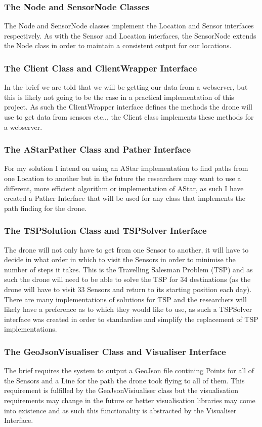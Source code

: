 \documentclass[12pt]{article}
\begin{document}
\subsubsection{The Node and SensorNode Classes}
The Node and SensorNode classes implement the Location and Sensor interfaces respectively. As with the Sensor and Location interfaces, the SensorNode extends the Node class in order to maintain a consistent output for our locations.
\subsubsection{The Client Class and  ClientWrapper Interface}
In the brief we are told that we will be getting our data from a webserver, but this is likely not going to be the case in a practical implementation of this project. As such the ClientWrapper interface defines the methods the drone will use to get data from sensors etc.., the Client class implements these methods for a webserver.
\subsubsection{The AStarPather Class and Pather Interface}
For my solution I intend on using an AStar implementation to find paths from one Location to another but in the future the researchers may want to use a different, more efficient algorithm or implementation of AStar, as such I have created a Pather Interface that will be used for any class that implements the path finding for the drone.
\subsubsection{The TSPSolution Class and TSPSolver Interface}
The drone will not only have to get from one Sensor to another, it will have to decide in what order in which to visit the Sensors in order to minimise the number of steps it takes. This is the Travelling Salesman Problem (TSP) and as such the drone will need to be able to solve the TSP for 34 destinations (as the drone will have to visit 33 Sensors and return to its starting position each day). There are many implementations of solutions for TSP and the researchers will likely have a preference as to which they would like to use, as such a TSPSolver interface was created in order to standardise and simplify the replacement of TSP implementations.
\subsubsection{The GeoJsonVisualiser Class and Visualiser Interface}
The brief requires the system to output a GeoJson file contining Points for all of the Sensors and a Line for the path the drone took flying to all of them. This requirement is fulfilled by the GeoJsonVisiualiser class but the visualisation requirements may change in the future or better visualisation libraries may come into existence and as such this functionality is abstracted by the Visualiser Interface.
\end{document}
